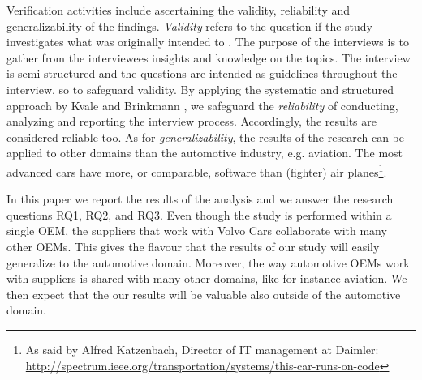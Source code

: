  Verification activities include ascertaining the validity, reliability and generalizability of the findings. {\em Validity} refers to the question if the study investigates what was originally intended to \cite{Kvale2015Interviews}. The purpose of the interviews is to gather from the interviewees insights and knowledge on the topics. The interview is semi-structured and the questions are intended as guidelines throughout the interview, so to safeguard validity. %
By applying the systematic and structured approach by Kvale and Brinkmann \cite{Kvale2015Interviews}, we safeguard the {\em reliability} of conducting, analyzing and reporting  the interview process. Accordingly, the results are considered reliable too. As for {\em generalizability}, the results of the research can be applied to other domains than the automotive industry, e.g. aviation. The most advanced cars have more, or comparable, software than (fighter) air planes\footnote{As said by Alfred Katzenbach, Director of IT management at Daimler: \url{http://spectrum.ieee.org/transportation/systems/this-car-runs-on-code}}.%

 In this paper we report the results of the analysis and we answer the research questions RQ1, RQ2, and RQ3. 
Even though the study is performed within a single OEM, the suppliers that work with Volvo Cars collaborate with many other OEMs. This gives the flavour that the results of our study will easily generalize to the automotive domain. Moreover, the way automotive OEMs work with suppliers is shared with many other domains, like for instance aviation. We then expect that the our results will be valuable also outside of the automotive domain.


